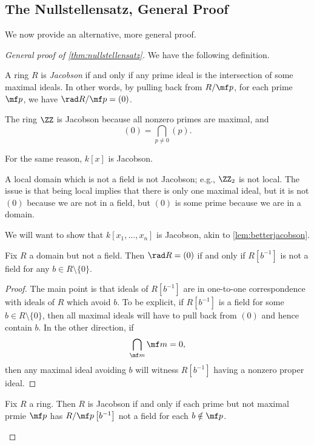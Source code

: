 \subsection{The Nullstellensatz, General Proof}
We now provide an alternative, more general proof.
\begin{proof}[General proof of \autoref{thm:nullstellensatz}]
	We have the following definition.
	\begin{definition}[Jacobson]
		A ring $R$ is \textit{Jacobson} if and only if any prime ideal is the intersection of some maximal ideals. In other words, by pulling back from $R/\mf p$, for each prime $\mf p$, we have $\rad R/\mf p=(0)$.
	\end{definition}
	\begin{example}
		The ring $\ZZ$ is Jacobson because all nonzero primes are maximal, and
		\[(0)=\bigcap_{p\ne0}(p).\]
	\end{example}
	\begin{example}
		For the same reason, $k[x]$ is Jacobson.
	\end{example}
	\begin{nex}
		A local domain which is not a field is not Jacobson; e.g., $\ZZ_2$ is not local. The issue is that being local implies that there is only one maximal ideal, but it is not $(0)$ because we are not in a field, but $(0)$ is some prime because we are in a domain.
	\end{nex}
	We will want to show that $k[x_1,\ldots,x_n]$ is Jacobson, akin to \autoref{lem:betterjacobson}.
	\begin{lemma}
		Fix $R$ a domain but not a field. Then $\rad R=(0)$ if and only if $R\left[b^{-1}\right]$ is not a field for any $b\in R\setminus\{0\}$.
	\end{lemma}
	\begin{proof}
		The main point is that ideals of $R\left[b^{-1}\right]$ are in one-to-one correspondence with ideals of $R$ which avoid $b$. To be explicit, if $R\left[b^{-1}\right]$ is a field for some $b\in R\setminus\{0\}$, then all maximal ideals will have to pull back from $(0)$ and hence contain $b$. In the other direction, if
		\[\bigcap_{\mf m}\mf m=0,\]
		then any maximal ideal avoiding $b$ will witness $R\left[b^{-1}\right]$ having a nonzero proper ideal.
	\end{proof}
	\begin{corollary} \label{cor:betterjacobson}
		Fix $R$ a ring. Then $R$ is Jacobson if and only if each prime but not maximal prmie $\mf p$ has $R/\mf p\left[b^{-1}\right]$ not a field for each $b\notin\mf p$.

\end{corollary}
\end{proof}

